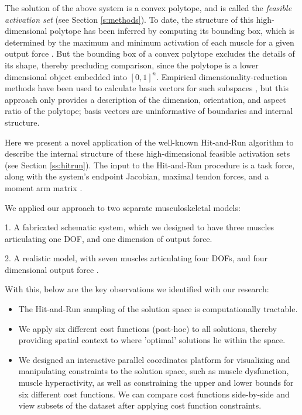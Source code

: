The solution of the above system is a convex polytope, and is called the \emph{feasible activation set} (see Section \ref{s:methods}).
To date, the structure of this high-dimensional polytope has been inferred by computing its bounding box, which is determined by the maximum and minimum activation of each muscle for a given output force \cite{kutch2011muscle,sohn2013cat_bounding_box,Valero-Cuevas2015high-dimensional}.
But the bounding box of a convex polytope excludes the details of its shape, thereby precluding comparison, since the polytope is a lower dimensional object embedded into $[0,1]^n$.
Empirical dimensionality-reduction methods have been used to calculate basis vectors for such subspaces \cite{Clewley2008Estimating,davella2005shared,krishnamoorthy2003muscle},
but this approach only provides a description of the dimension, orientation, and aspect ratio of the polytope; basis vectors are uninformative of boundaries and internal structure.

Here we present a novel application of the well-known Hit-and-Run algorithm \cite{smith1984efficient} to describe the internal structure of these high-dimensional feasible activation sets (see Section \ref{ss:hitrun}).
The input to the Hit-and-Run procedure is a task force, along with the system's endpoint Jacobian, maximal tendon forces, and a moment arm matrix \cite{Valero-Cuevas2009mathematical}.

We applied our approach to two separate musculoskeletal models:

1. A fabricated schematic system, which we designed to have three muscles articulating one DOF, and one dimension of output force.

2. A realistic model, with seven muscles articulating four DOFs, and four dimensional output force \cite{Valero-Cuevas1998Large}.

With this, below are the key observations we identified with our research:
\begin{itemize}
\item {The Hit-and-Run sampling of the solution space is computationally tractable.}
\item {We apply six different cost functions (post-hoc) to all solutions, thereby providing spatial context to where 'optimal' solutions lie within the space.}
\item {We designed an interactive parallel coordinates platform for visualizing and manipulating constraints to the solution space, such as muscle dysfunction, muscle hyperactivity, as well as constraining the upper and lower bounds for six different cost functions. We can compare cost functions side-by-side and view subsets of the dataset after applying cost function constraints. }
\end{itemize}

